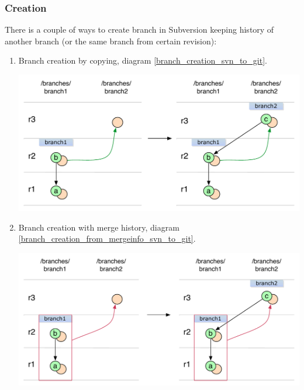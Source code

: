 \subsubsection{Creation}

There is a couple of ways to create branch in Subversion keeping history of another branch (or the same branch from certain revision):

\begin{enumerate}
\compactlist
\item Branch creation by copying, diagram \ref{branch_creation_svn_to_git}.
\begin{center}
\includegraphics[width=\linewidth]{img/diagrams/branch_creation_svn_to_git.pdf}%
\label{branch_creation_svn_to_git}%
\end{center}

\item Branch creation with merge history, diagram \ref{branch_creation_from_mergeinfo_svn_to_git}.
\begin{center}
\includegraphics[width=\linewidth]{img/diagrams/branch_creation_from_mergeinfo_svn_to_git.pdf}%
\label{branch_creation_from_mergeinfo_svn_to_git}%
\end{center}
\end{enumerate}

